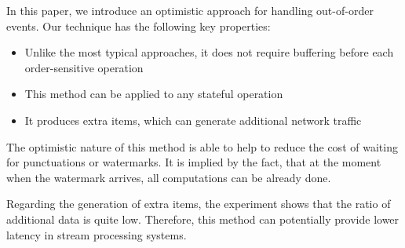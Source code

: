 
\label {fs-conclusion}

In this paper, we introduce an optimistic approach for handling out-of-order events. Our technique has the following key properties:

\begin{itemize}
    \item Unlike the most typical approaches, it does not require buffering before each order-sensitive operation
    \item This method can be applied to any stateful operation
    \item It produces extra items, which can generate additional network traffic
\end{itemize}

The optimistic nature of this method is able to help to reduce the cost of waiting for punctuations or watermarks. It is implied by the fact, that at the moment when the watermark arrives, all computations can be already done. 

Regarding the generation of extra items, the experiment shows that the ratio of additional data is quite low. Therefore, this method can potentially provide lower latency in stream processing systems.